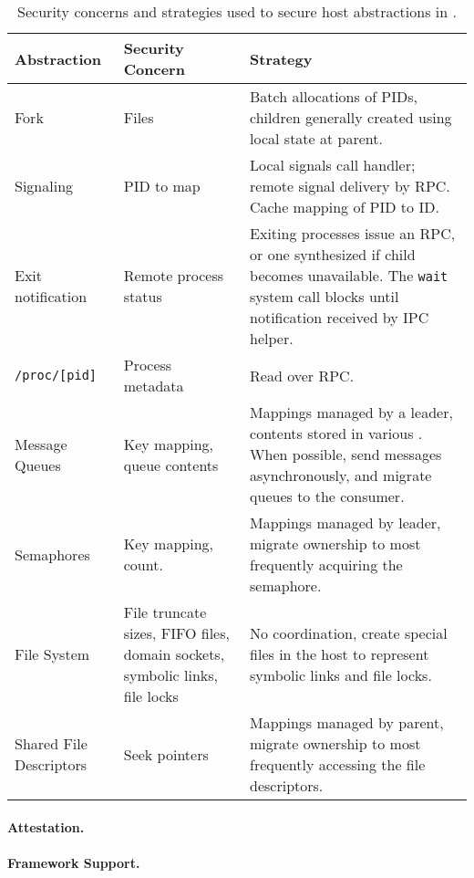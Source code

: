 \begin{table}
\footnotesize
\centering
\begin{tabular}{|p{1in}|p{2.5in}|p{2.5in}|}
\hline
{\bf Abstraction} & {\bf Security Concern} & {\bf Strategy} \\
\hline
Fork & 
\raggedright
Files & Batch allocations of PIDs, children generally created using local state at parent.  \\
\hline
Signaling & PID to \picoproc{} map & Local signals call handler; remote signal delivery by RPC.  Cache mapping of PID to \picoproc{} ID. \\
\hline
\raggedright
Exit notification & 
\raggedright
Remote process status  & Exiting processes issue an RPC, or one synthesized if child becomes unavailable.  The {\tt wait} system call blocks until notification received by IPC helper. \\
\hline
{\tt /proc/[pid]} & Process metadata & Read over RPC.  \\
\hline
Message Queues & 
\raggedright
Key mapping, queue contents & Mappings managed by a leader, contents stored in various \picoprocs{}.  When possible, send messages asynchronously, and migrate queues to the consumer.\\
\hline
Semaphores & 
\raggedright
Key mapping, count. & Mappings managed by leader, migrate ownership to \picoproc{} most frequently acquiring the semaphore. \\
\hline
\raggedright
File System & 
\raggedright
File truncate sizes, FIFO files, domain sockets, symbolic links, file locks & No coordination, create special files in the host to represent symbolic links and file locks. \\
\hline
\raggedright
Shared File Descriptors & 
\raggedright
Seek pointers & Mappings managed by parent, migrate ownership to \picoproc{} most frequently accessing the file descriptors. \\
\hline
\end{tabular}
\caption[Securig host abstractions in \sysname{}]
{Security concerns and strategies used to secure host abstractions in \sysname{}.}
\label{tab:gsgx:secure}
\end{table}

\paragraph{Attestation.}

\paragraph{Framework Support.}

